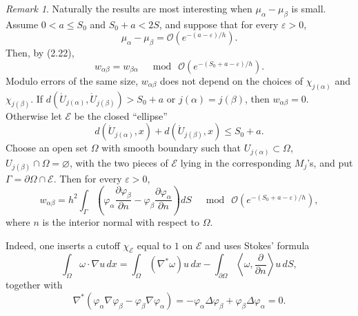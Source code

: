 \documentclass[11pt,a4paper]{article}
\newcommand{\cO}{\mathcal O}
\newcommand{\eps}{\varepsilon}
\numberwithin{equation}{section}
\theoremstyle{remark}
\newtheorem{remark}[theorem]{Remark}
\begin{document}
\begin{remark}
Naturally the results are most interesting when $\mu_\alpha-\mu_\beta$ is small. Assume $0<a\le S_0$ and $S_0+a<2S$, and suppose that for every $\eps>0$,
\begin{equation}
\mu_\alpha-\mu_\beta=\cO\!\left(e^{-(a-\eps)/h}\right).
\end{equation}
Then, by (2.22),
\[
w_{\alpha\beta}=w_{\beta\alpha}\quad\bmod\ \cO\!\left(e^{-(S_0+a-\eps)/h}\right).
\]
Modulo errors of the same size, $w_{\alpha\beta}$ does not depend on the choices of $\chi_{j(\alpha)}$ and $\chi_{j(\beta)}$. If $d(\mathring U_{j(\alpha)},\mathring U_{j(\beta)})>S_0+a$ or $j(\alpha)=j(\beta)$, then $w_{\alpha\beta}=0$. Otherwise let $\mathcal E$ be the closed ``ellipse''
\[
d(\mathring U_{j(\alpha)},x)+d(\mathring U_{j(\beta)},x)\le S_0+a.
\]
Choose an open set $\Omega$ with smooth boundary such that $U_{j(\alpha)}\subset\Omega$, $U_{j(\beta)}\cap\Omega=\varnothing$, with the two pieces of $\mathcal E$ lying in the corresponding $M_j$'s, and put $\Gamma=\partial\Omega\cap\mathcal E$. Then for every $\eps>0$,
\begin{equation}
w_{\alpha\beta}=h^2\int_\Gamma\left(\varphi_\alpha\frac{\partial\varphi_\beta}{\partial n}
-\varphi_\beta\frac{\partial\varphi_\alpha}{\partial n}\right)dS
\quad\bmod\ \cO\!\left(e^{-(S_0+a-\eps)/h}\right),
\end{equation}
where $n$ is the interior normal with respect to $\Omega$.
\end{remark}
Indeed, one inserts a cutoff $\chi_{\mathcal E}$ equal to $1$ on $\mathcal E$ and uses Stokes' formula
\[
\int_\Omega\omega\cdot\nabla u\,dx
=\int_\Omega(\nabla^*\omega)u\,dx-
\int_{\partial\Omega}\left\langle\omega,\frac\partial{\partial n}\right\rangle u\,dS,
\]
together with
\[
\nabla^*(\varphi_\alpha\nabla\varphi_\beta-
\varphi_\beta\nabla\varphi_\alpha)
=-\varphi_\alpha\Delta\varphi_\beta+
\varphi_\beta\Delta\varphi_\alpha=0.
\]
\end{document}

